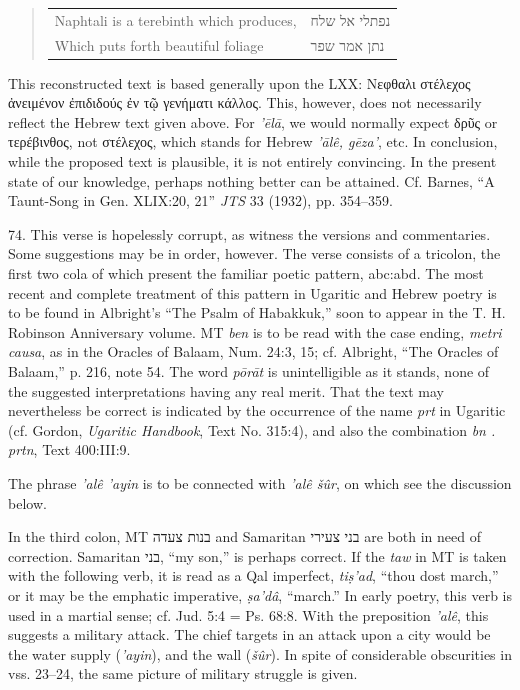 \begin{enumerate}
\begin{quote}
\begin{tabular}{ll}
Naphtali is a terebinth which produces, & נפתלי אל שלח \\
Which puts forth beautiful foliage & נתן אמר שפר \\
\end{tabular}
\end{quote}

This reconstructed text is based generally upon the LXX: Νεφθαλι στέλεχος
ἀνειμένον ἐπιδιδούς ἐν τῷ γενήματι κάλλος. This, however, does not necessarily
reflect the Hebrew text given above. For \emph{'ēlā}, we would normally expect
δρῦς or τερέβινθος, not στέλεχος, which stands for Hebrew \emph{'ālê, gēza'},
etc. In conclusion, while the proposed text is plausible, it is not entirely
convincing. In the present state of our knowledge, perhaps nothing better can
be attained. Cf. Barnes, ``A Taunt-Song in Gen. XLIX:20, 21'' \emph{JTS} 33
(1932), pp. 354--359.

74. This verse is hopelessly corrupt, as witness the versions and commentaries.
Some suggestions may be in order, however. The verse consists of a tricolon,
the first two cola of which present the familiar poetic pattern, abc:abd. The
most recent and complete treatment of this pattern in Ugaritic and Hebrew
poetry is to be found in Albright's ``The Psalm of Habakkuk,'' soon to appear
in the T. H. Robinson Anniversary volume. MT \emph{ben} is to be read with the
case ending, \emph{metri causa}, as in the Oracles of Balaam, Num. 24:3, 15;
cf. Albright, ``The Oracles of Balaam,'' p. 216, note 54. The word
\emph{pōrāt} is unintelligible as it stands, none of the suggested
interpretations having any real merit. That the text may nevertheless be
correct is indicated by the occurrence of the name \emph{prt} in Ugaritic
(cf. Gordon, \emph{Ugaritic Handbook}, Text No. 315:4), and also the
combination \emph{bn . prtn}, Text 400:III:9.

The phrase \emph{'alê 'ayin} is to be connected with \emph{'alê šûr}, on
which see the discussion below.

In the third colon, MT בנות צעדה and Samaritan בני צעירי are both in need of
correction. Samaritan בני, ``my son,'' is perhaps correct. If the \emph{taw}
in MT is taken with the following verb, it is read as a Qal imperfect,
\emph{tiṣ'ad}, ``thou dost march,'' or it may be the emphatic imperative,
\emph{ṣa'dâ}, ``march.'' In early poetry, this verb is used in a martial
sense; cf. Jud. 5:4 = Ps. 68:8. With the preposition \emph{'alê}, this suggests
a military attack. The chief targets in an attack upon a city would be the
water supply (\emph{'ayin}), and the wall (\emph{šûr}). In spite of
considerable obscurities in vss. 23--24, the same picture of military struggle
is given.


\end{enumerate}
